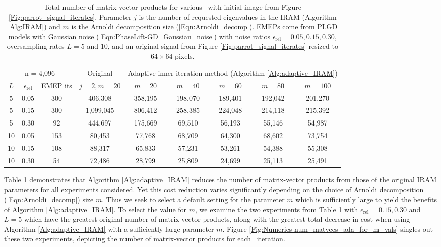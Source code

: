 \begin{table}[H]
\centering
\begin{tabular}{ |ccc|c|ccccc| }
 \hline
			  \multicolumn{3}{|c|}{n = 4,096} &  Original
			&  \multicolumn{5}{c|}{Adaptive inner iteration method (Algorithm \ref{Alg:adaptive_IRAM})}	\\
$L$ & $\epsilon_\text{rel}$ & EMEP its & $j=2, m=20$	& $m=20$  & $m=40$  & $m=60$  & $m=80$  & $m=100$   \\
 \hline
  5 &  0.05 & 300 &  406,308  &  358,195  &  198,070  &  189,401  &  192,042  &  201,270  \\ 
  5 &  0.15 & 300 & 1,099,045  &  806,412  &  258,385  &  224,048  &  214,118  &  215,392  \\ 
  5 &  0.30 &  92 &  444,697  &  175,669  &   69,510  &   56,193  &   55,146  &   54,987  \\ 
 10 &  0.05 & 153 &   80,453  &   77,768  &   68,709  &   64,300  &   68,602  &   73,754  \\ 
 10 &  0.15 & 108 &   88,317  &   65,833  &   57,231  &   53,261  &   54,388  &   55,308  \\ 
 10 &  0.30 &  54 &   72,486  &   28,799  &   25,809  &   24,699  &   25,113  &   25,491  \\ 
 \hline
\end{tabular}

\caption{
Total number of matrix-vector products for various \emeps \ with initial image from Figure \ref{Fig:parrot_signal_iterates}.  
Parameter $j$ is the number of requested eigenvalues in the IRAM (Algorithm \ref{Alg:IRAM}) and $m$ is the Arnoldi decomposition size (\ref{Eqn:Arnoldi_decomp}). 
EMEPs come from PLGD models with Gaussian noise	(\ref{Eqn:PhaseLift-GD_Gaussian_noise}) with noise ratios $\epsilon_\text{rel} = 0.05, 0.15, 0.30$, oversampling rates $L = 5$ and $10$, and an original signal from Figure \ref{Fig:parrot_signal_iterates} resized to $64 \times 64$ pixels.
} \label{Tab:Numerics-num_matvecs_orig_vs_ada}
\end{table}



Table \ref{Tab:Numerics-num_matvecs_orig_vs_ada} demonstrates that Algorithm \ref{Alg:adaptive_IRAM} reduces the number of matrix-vector products from those of the original IRAM parameters for all experiments considered.
Yet this cost reduction varies significantly depending on the choice of Arnoldi decomposition (\ref{Eqn:Arnoldi_decomp}) size $m$.
Thus we seek to select a default setting for the parameter $m$ which is sufficiently large to yield the benefits of Algorithm \ref{Alg:adaptive_IRAM}.
To select the value for $m$, we examine the two experiments from Table \ref{Tab:Numerics-num_matvecs_orig_vs_ada} with $\epsilon_\text{rel} = 0.15, 0.30$ and $L=5$ which have the greatest original number of matrix-vector products, along with the greatest total decrease in cost when using Algorithm \ref{Alg:adaptive_IRAM} with a sufficiently large parameter $m$.
Figure \ref{Fig:Numerics-num_matvecs_ada_for_m_vals} singles out these two experiments, depicting the number of matrix-vector products for each \emep \ iteration.

